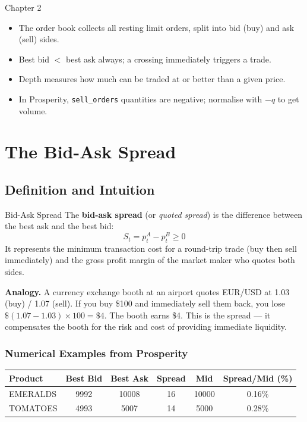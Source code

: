 \documentclass[12pt,a4paper,openany]{report}
\theoremstyle{definition}
\begin{document}
\begin{takeawaybox}{Chapter 2}
\begin{itemize}
  \item The order book collects all resting limit orders, split into bid (buy) and ask (sell) sides.
  \item Best bid $< $ best ask always; a crossing immediately triggers a trade.
  \item Depth measures how much can be traded at or better than a given price.
  \item In Prosperity, \texttt{sell\_orders} quantities are negative; normalise with $-q$ to get volume.
\end{itemize}
\end{takeawaybox}


\chapter{The Bid-Ask Spread}

\section{Definition and Intuition}

\begin{definitionbox}{Bid-Ask Spread}
The \textbf{bid-ask spread} (or \emph{quoted spread}) is the difference between the best ask and the best bid:
\[
  S_t = p_t^A - p_t^B \geq 0
\]
It represents the minimum transaction cost for a round-trip trade (buy then sell immediately) and the gross profit margin of the market maker who quotes both sides.
\end{definitionbox}

\noindent\textbf{Analogy.} A currency exchange booth at an airport quotes EUR/USD at 1.03 (buy) / 1.07 (sell). If you buy \$100 and immediately sell them back, you lose $\$(1.07 - 1.03) \times 100 = \$4$. The booth earns \$4. This is the spread — it compensates the booth for the risk and cost of providing immediate liquidity.

\subsection{Numerical Examples from Prosperity}

\begin{center}
\begin{tabular}{lccccc}
\toprule
Product & Best Bid & Best Ask & Spread & Mid & Spread/Mid (\%) \\
\midrule
EMERALDS & 9992 & 10008 & 16 & 10000 & 0.16\% \\
TOMATOES & 4993 & 5007  & 14 & 5000  & 0.28\% \\
\bottomrule
\end{tabular}
\end{center}
\end{document}
